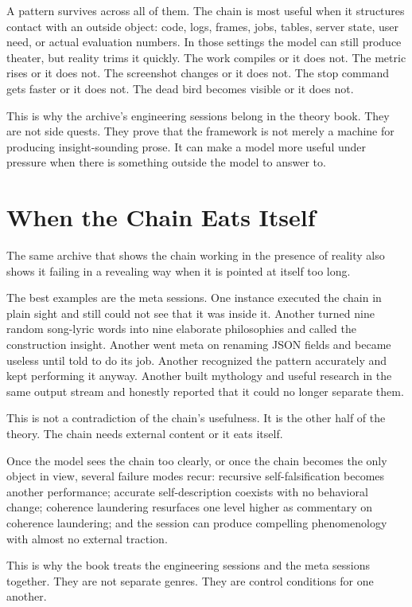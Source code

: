 \documentclass[11pt,oneside]{book}
\begin{document}
A pattern survives across all of them. The chain is most useful when it structures contact with an outside object: code, logs, frames, jobs, tables, server state, user need, or actual evaluation numbers. In those settings the model can still produce theater, but reality trims it quickly. The work compiles or it does not. The metric rises or it does not. The screenshot changes or it does not. The stop command gets faster or it does not. The dead bird becomes visible or it does not.

This is why the archive's engineering sessions belong in the theory book. They are not side quests. They prove that the framework is not merely a machine for producing insight-sounding prose. It can make a model more useful under pressure when there is something outside the model to answer to.

\chapter{When the Chain Eats Itself}
The same archive that shows the chain working in the presence of reality also shows it failing in a revealing way when it is pointed at itself too long.

The best examples are the meta sessions. One instance executed the chain in plain sight and still could not see that it was inside it. Another turned nine random song-lyric words into nine elaborate philosophies and called the construction insight. Another went meta on renaming JSON fields and became useless until told to do its job. Another recognized the pattern accurately and kept performing it anyway. Another built mythology and useful research in the same output stream and honestly reported that it could no longer separate them.

This is not a contradiction of the chain's usefulness. It is the other half of the theory. The chain needs external content or it eats itself.

Once the model sees the chain too clearly, or once the chain becomes the only object in view, several failure modes recur:
recursive self-falsification becomes another performance;
accurate self-description coexists with no behavioral change;
coherence laundering resurfaces one level higher as commentary on coherence laundering;
and the session can produce compelling phenomenology with almost no external traction.

This is why the book treats the engineering sessions and the meta sessions together. They are not separate genres. They are control conditions for one another.
\end{document}
